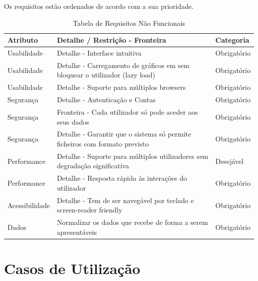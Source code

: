 Os requisitos estão ordenados de acordo com a sua prioridade.
\begin{table}[h!]
    \centering
    \begin{tabular}{|l|p{7cm}|l|}
    \hline
    \textbf{Atributo} & \textbf{Detalhe / Restrição - Fronteira} & \textbf{Categoria} \\
    \hline
    Usabilidade & Detalhe - Interface intuitiva & Obrigatório \\
    Usabilidade & Detalhe - Carregamento de gráficos em sem bloquear o utilizador (lazy load) & Obrigatório \\
    Usabilidade & Detalhe - Suporte para múltiplos browsers & Obrigatório \\
    Segurança & Detalhe - Autenticação e Contas & Obrigatório \\
    Segurança & Fronteira - Cada utilizador só pode aceder aos seus dados & Obrigatório \\
    Segurança & Detalhe - Garantir que o sistema só permite ficheiros com formato previsto & Obrigatório \\
    Performance & Detalhe - Suporte para múltiplos utilizadores sem degradação significativa & Desejável \\
    Performance & Detalhe - Resposta rápida às interações do utilizador & Obrigatório \\
    Acessibilidade & Detalhe - Tem de ser navegável por teclado e screen-reader friendly & Obrigatório \\
    Dados & Normalizar os dados que recebe de forma a serem apresentáveis & Obrigatório \\

    \hline
    \end{tabular}
    \caption{Tabela de Requisitos Não Funcionais}
    \label{tab:requisitosNaofuncionais}
    \end{table}
    

\chapter{Casos de Utilização}
\label{ch:casosUtilizacao}

